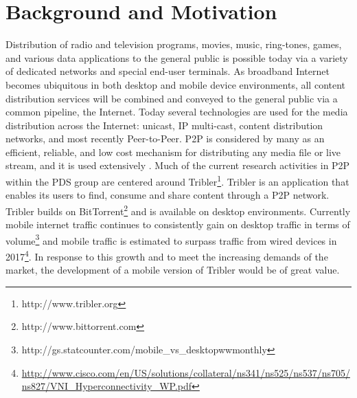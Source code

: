 \section{Background and Motivation}
Distribution of radio and television programs, movies, music, ring-tones, games, and various data applications to the general public is possible today via a variety of dedicated networks and special end-user terminals. As broadband Internet becomes ubiquitous in both desktop and mobile device environments, all content distribution services will be combined and conveyed to the general public via a common pipeline, the Internet. Today several technologies are used for the media distribution across the Internet: unicast, IP multi-cast, content distribution networks, and most recently Peer-to-Peer. P2P is considered by many as an efficient, reliable, and low cost mechanism for distributing any media file or live stream, and it is used extensively \cite{internet_study}. Much of the current research activities in P2P within the PDS group are centered around Tribler\footnote{http://www.tribler.org}. Tribler is an application that enables its users to find, consume and share content through a P2P network. Tribler builds on BitTorrent\footnote{http://www.bittorrent.com} and is available on desktop environments. Currently mobile internet traffic continues to consistently gain on desktop traffic in terms of volume\footnote{http://gs.statcounter.com/mobile\_vs\_desktop\-ww\-monthly} and mobile traffic is estimated to surpass traffic from wired devices in 2017\footnote{\url{http://www.cisco.com/en/US/solutions/collateral/ns341/ns525/ns537/ns705/ns827/VNI\_Hyperconnectivity\_WP.pdf}}. In response to this growth and to meet the increasing demands of the market, the development of a mobile version of Tribler would be of great value. 
